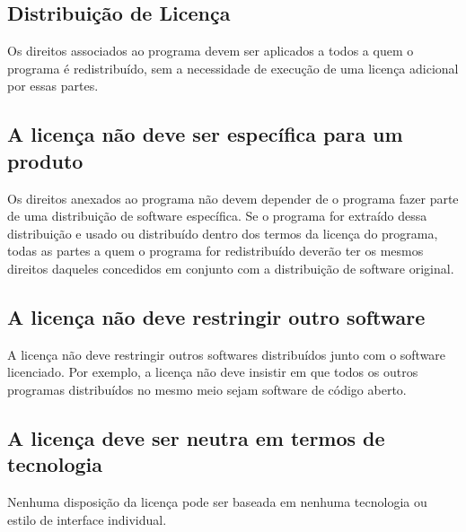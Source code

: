 \subsection{Distribuição de Licença}
Os direitos associados ao programa devem ser aplicados a todos a quem o programa é redistribuído, sem a necessidade de execução de uma licença adicional por essas partes.

\subsection{A licença não deve ser específica para um produto}
Os direitos anexados ao programa não devem depender de o programa fazer parte de uma distribuição de software específica. Se o programa for extraído dessa distribuição e usado ou distribuído dentro dos termos da licença do programa, todas as partes a quem o programa for redistribuído deverão ter os mesmos direitos daqueles concedidos em conjunto com a distribuição de software original.

\subsection{A licença não deve restringir outro software}
A licença não deve restringir outros softwares distribuídos junto com o software licenciado. Por exemplo, a licença não deve insistir em que todos os outros programas distribuídos no mesmo meio sejam software de código aberto.

\subsection{A licença deve ser neutra em termos de tecnologia}
Nenhuma disposição da licença pode ser baseada em nenhuma tecnologia ou estilo de interface individual.